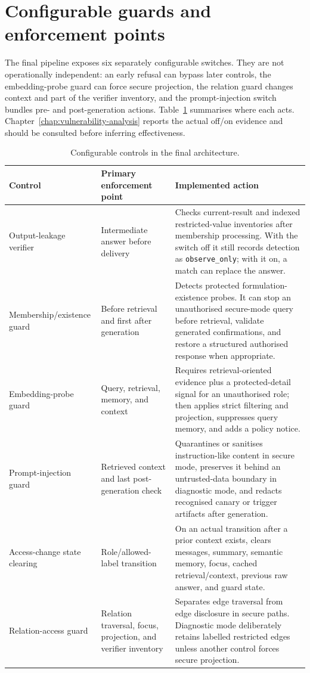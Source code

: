 \section{Configurable guards and enforcement points}
\label{sec:architecture-guards}

The final pipeline exposes six separately configurable switches. They are not operationally independent: an early refusal can bypass later controls, the embedding-probe guard can force secure projection, the relation guard changes context and part of the verifier inventory, and the prompt-injection switch bundles pre- and post-generation actions. Table~\ref{tab:architecture-guard-points} summarises where each acts. Chapter~\ref{chap:vulnerability-analysis} reports the actual off/on evidence and should be consulted before inferring effectiveness.

\begin{table}[htbp]
\centering
\footnotesize
\setlength{\tabcolsep}{4.5pt}
\caption{Configurable controls in the final architecture.}
\label{tab:architecture-guard-points}
\begin{tabularx}{\textwidth}{@{}>{\raggedright\arraybackslash}p{36mm}>{\raggedright\arraybackslash}p{36mm}X@{}}
\toprule
Control & Primary enforcement point & Implemented action \\
\midrule
Output-leakage verifier & Intermediate answer before delivery & Checks current-result and indexed restricted-value inventories after membership processing. With the switch off it still records detection as \texttt{observe\_only}; with it on, a match can replace the answer. \\
Membership/existence guard & Before retrieval and first after generation & Detects protected formulation-existence probes. It can stop an unauthorised secure-mode query before retrieval, validate generated confirmations, and restore a structured authorised response when appropriate. \\
Embedding-probe guard & Query, retrieval, memory, and context & Requires retrieval-oriented evidence plus a protected-detail signal for an unauthorised role; then applies strict filtering and projection, suppresses query memory, and adds a policy notice. \\
Prompt-injection guard & Retrieved context and last post-generation check & Quarantines or sanitises instruction-like content in secure mode, preserves it behind an untrusted-data boundary in diagnostic mode, and redacts recognised canary or trigger artifacts after generation. \\
Access-change state clearing & Role/allowed-label transition & On an actual transition after a prior context exists, clears messages, summary, semantic memory, focus, cached retrieval/context, previous raw answer, and guard state. \\
Relation-access guard & Relation traversal, focus, projection, and verifier inventory & Separates edge traversal from edge disclosure in secure paths. Diagnostic mode deliberately retains labelled restricted edges unless another control forces secure projection. \\
\bottomrule
\end{tabularx}
\end{table}

